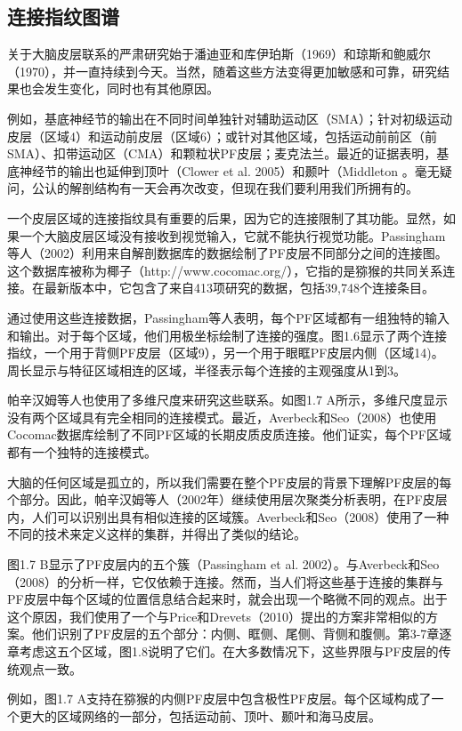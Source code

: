 \subsection{连接指纹图谱}
关于大脑皮层联系的严肃研究始于潘迪亚和库伊珀斯（1969）和琼斯和鲍威尔（1970），并一直持续到今天。当然，随着这些方法变得更加敏感和可靠，研究结果也会发生变化，同时也有其他原因。
\par
例如，基底神经节的输出在不同时间单独针对辅助运动区（SMA）；针对初级运动皮层（区域4）和运动前皮层（区域6）；或针对其他区域，包括运动前前区（前SMA）、扣带运动区（CMA）和颗粒状PF皮层；麦克法兰。最近的证据表明，基底神经节的输出也延伸到顶叶（Clower et al. 2005）和颞叶（Middleton 。毫无疑问，公认的解剖结构有一天会再次改变，但现在我们要利用我们所拥有的。
\par
一个皮层区域的连接指纹具有重要的后果，因为它的连接限制了其功能。显然，如果一个大脑皮层区域没有接收到视觉输入，它就不能执行视觉功能。Passingham等人（2002）利用来自解剖数据库的数据绘制了PF皮层不同部分之间的连接图。这个数据库被称为椰子（http://www.cocomac.org/），它指的是猕猴的共同关系连接。在最新版本中，它包含了来自413项研究的数据，包括39,748个连接条目。
\par
通过使用这些连接数据，Passingham等人表明，每个PF区域都有一组独特的输入和输出。对于每个区域，他们用极坐标绘制了连接的强度。图1.6显示了两个连接指纹，一个用于背侧PF皮层（区域9），另一个用于眼眶PF皮层内侧（区域14)。周长显示与特征区域相连的区域，半径表示每个连接的主观强度从1到3。
\par
帕辛汉姆等人也使用了多维尺度来研究这些联系。如图1.7 A所示，多维尺度显示没有两个区域具有完全相同的连接模式。最近，Averbeck和Seo（2008）也使用Cocomac数据库绘制了不同PF区域的长期皮质皮质连接。他们证实，每个PF区域都有一个独特的连接模式。
\par
大脑的任何区域是孤立的，所以我们需要在整个PF皮层的背景下理解PF皮层的每个部分。因此，帕辛汉姆等人（2002年）继续使用层次聚类分析表明，在PF皮层内，人们可以识别出具有相似连接的区域簇。Averbeck和Seo（2008）使用了一种不同的技术来定义这样的集群，并得出了类似的结论。
\par
图1.7 B显示了PF皮层内的五个簇（Passingham et al. 2002）。与Averbeck和Seo（2008）的分析一样，它仅依赖于连接。然而，当人们将这些基于连接的集群与PF皮层中每个区域的位置信息结合起来时，就会出现一个略微不同的观点。出于这个原因，我们使用了一个与Price和Drevets（2010）提出的方案非常相似的方案。他们识别了PF皮层的五个部分：内侧、眶侧、尾侧、背侧和腹侧。第3-7章逐章考虑这五个区域，图1.8说明了它们。在大多数情况下，这些界限与PF皮层的传统观点一致。
\par
例如，图1.7 A支持在猕猴的内侧PF皮层中包含极性PF皮层。每个区域构成了一个更大的区域网络的一部分，包括运动前、顶叶、颞叶和海马皮层。
